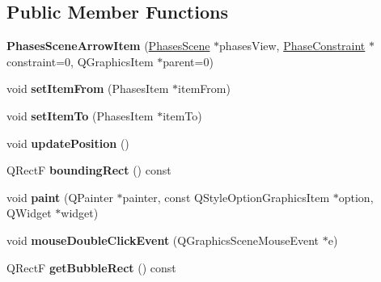 \subsection*{Public Member Functions}
\begin{DoxyCompactItemize}
\item 
\hypertarget{class_phases_scene_arrow_item_a608b3ada066b2b9dd5164b9db6c03457}{{\bfseries Phases\-Scene\-Arrow\-Item} (\hyperlink{class_phases_scene}{Phases\-Scene} $\ast$phases\-View, \hyperlink{class_phase_constraint}{Phase\-Constraint} $\ast$constraint=0, Q\-Graphics\-Item $\ast$parent=0)}\label{class_phases_scene_arrow_item_a608b3ada066b2b9dd5164b9db6c03457}

\item 
\hypertarget{class_phases_scene_arrow_item_a39a05a16c91c63bd20a379abb8558573}{void {\bfseries set\-Item\-From} (Phases\-Item $\ast$item\-From)}\label{class_phases_scene_arrow_item_a39a05a16c91c63bd20a379abb8558573}

\item 
\hypertarget{class_phases_scene_arrow_item_a53b9233a0c1e38d124138b34958877b0}{void {\bfseries set\-Item\-To} (Phases\-Item $\ast$item\-To)}\label{class_phases_scene_arrow_item_a53b9233a0c1e38d124138b34958877b0}

\item 
\hypertarget{class_phases_scene_arrow_item_a34356c5e1903324f0a873e7f42640f15}{void {\bfseries update\-Position} ()}\label{class_phases_scene_arrow_item_a34356c5e1903324f0a873e7f42640f15}

\item 
\hypertarget{class_phases_scene_arrow_item_a8592d8d663d60986f23e4b50495a17cc}{Q\-Rect\-F {\bfseries bounding\-Rect} () const }\label{class_phases_scene_arrow_item_a8592d8d663d60986f23e4b50495a17cc}

\item 
\hypertarget{class_phases_scene_arrow_item_aed740497a7cf49d2c5faef2a7ca8b148}{void {\bfseries paint} (Q\-Painter $\ast$painter, const Q\-Style\-Option\-Graphics\-Item $\ast$option, Q\-Widget $\ast$widget)}\label{class_phases_scene_arrow_item_aed740497a7cf49d2c5faef2a7ca8b148}

\item 
\hypertarget{class_phases_scene_arrow_item_a14547aeed3e748449d2a9e0cf7c9e4e2}{void {\bfseries mouse\-Double\-Click\-Event} (Q\-Graphics\-Scene\-Mouse\-Event $\ast$e)}\label{class_phases_scene_arrow_item_a14547aeed3e748449d2a9e0cf7c9e4e2}

\item 
\hypertarget{class_phases_scene_arrow_item_a598d573afc4bda26033f9945dd1fcd33}{Q\-Rect\-F {\bfseries get\-Bubble\-Rect} () const }\label{class_phases_scene_arrow_item_a598d573afc4bda26033f9945dd1fcd33}

\end{DoxyCompactItemize}
